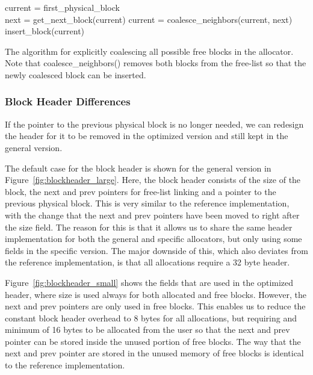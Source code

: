 \begin{algorithm}[H]
current = first\_physical\_block\\
 {
next = get\_next\_block(current)\;
 {
    current = coalesce\_neighbors(current, next)\;
    insert\_block(current)\;
}
}
\label{algorithm:coalesce_blocks}
\caption{The algorithm for explicitly coalescing all possible free blocks in the allocator. Note that coalesce\_neighbors() removes both blocks from the free-list so that the newly coalesced block can be inserted.}
\end{algorithm}

\subsubsection{Block Header Differences}

If the pointer to the previous physical block is no longer needed, we can redesign the header for it to be removed in the optimized version and still kept in the general version.

The default case for the block header is shown for the general version in Figure~\ref{fig:blockheader_large}. Here, the block header consists of the size of the block, the next and prev pointers for free-list linking and a pointer to the previous physical block. This is very similar to the reference implementation, with the change that the next and prev pointers have been moved to right after the size field. The reason for this is that it allows us to share the same header implementation for both the general and specific allocators, but only using some fields in the specific version. The major downside of this, which also deviates from the reference implementation, is that all allocations require a 32 byte header.


Figure~\ref{fig:blockheader_small} shows the fields that are used in the optimized header, where size is used always for both allocated and free blocks. However, the next and prev pointers are only used in free blocks. This enables us to reduce the constant block header overhead to 8 bytes for all allocations, but requiring and minimum of 16 bytes to be allocated from the user so that the next and prev pointer can be stored inside the unused portion of free blocks. The way that the next and prev pointer are stored in the unused memory of free blocks is identical to the reference implementation.

